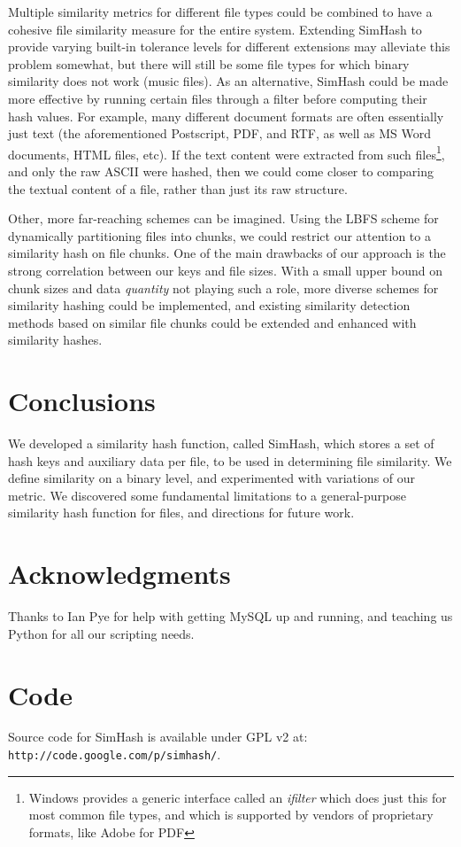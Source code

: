 \documentclass[10pt, twocolumn]{article}
\begin{document}
Multiple similarity metrics for different file types could be combined to have a cohesive file similarity measure for the entire system.  Extending SimHash to provide varying built-in tolerance levels for different extensions may alleviate this problem somewhat, but there will still be some file types for which binary similarity does not work (music files).  As an alternative, SimHash could be made more effective by running certain files through a filter before computing their hash values.  For example, many different document formats are often essentially just text (the aforementioned Postscript, PDF, and RTF, as well as MS Word documents, HTML files, etc).  If the text content were extracted from such files\footnote{Windows provides a generic interface called an {\it ifilter} which does just this for most common file types, and which is supported by vendors of proprietary formats, like Adobe for PDF}, and only the raw ASCII were hashed, then we could come closer to comparing the textual content of a file, rather than just its raw structure.

Other, more far-reaching schemes can be imagined.  Using the LBFS \cite{lbfs} scheme for dynamically partitioning files into chunks, we could restrict our attention to a similarity hash on file chunks.  One of the main drawbacks of our approach is the strong correlation between our keys and file sizes.  With a small upper bound on chunk sizes and data {\it quantity} not playing such a role, more diverse schemes for similarity hashing could be implemented, and existing similarity detection methods based on similar file chunks could be extended and enhanced with similarity hashes. 



\section{Conclusions}

We developed a similarity hash function, called SimHash, which stores a set of hash keys and auxiliary data per file, to be used in determining file similarity. We define similarity on a binary level, and experimented with variations of our metric. We discovered some fundamental limitations to a general-purpose similarity hash function for files, and directions for future work.

\section{Acknowledgments}
Thanks to Ian Pye for help with getting MySQL up and running, and teaching us Python for all our scripting needs.

\section{Code}

Source code for SimHash is available under GPL v2 at: { \tt http://code.google.com/p/simhash/}.






\end{document}
